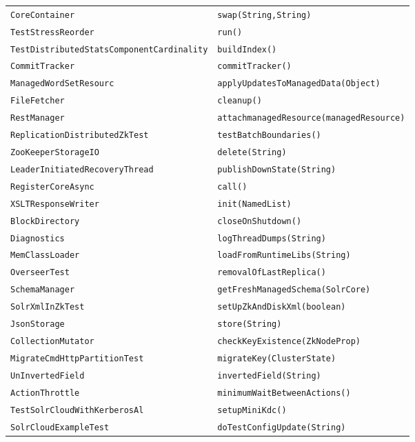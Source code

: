 \begin{center}
\begin{longtable}{ll}
\lstinline/CoreContainer/&{\lstinline/swap(String,String)/}\\
\lstinline/TestStressReorder/&{\lstinline/run()/}\\
\lstinline/TestDistributedStatsComponentCardinality/&{\lstinline/buildIndex()/}\\
\lstinline/CommitTracker/&{\lstinline/commitTracker()/}\\
\lstinline/ManagedWordSetResourc/&{\lstinline/applyUpdatesToManagedData(Object)/}\\
\lstinline/FileFetcher/&{\lstinline/cleanup()/}\\
\lstinline/RestManager/&{\lstinline/attachmanagedResource(managedResource)/}\\
\lstinline/ReplicationDistributedZkTest/&{\lstinline/testBatchBoundaries()/}\\
\lstinline/ZooKeeperStorageIO/&{\lstinline/delete(String)/}\\
\lstinline/LeaderInitiatedRecoveryThread/&{\lstinline/publishDownState(String)/}\\
\lstinline/RegisterCoreAsync/&{\lstinline/call()/}\\
\lstinline/XSLTResponseWriter/&{\lstinline/init(NamedList)/}\\
\lstinline/BlockDirectory/&{\lstinline/closeOnShutdown()/}\\
\lstinline/Diagnostics/&{\lstinline/logThreadDumps(String)/}\\
\lstinline/MemClassLoader/&{\lstinline/loadFromRuntimeLibs(String)/}\\
\lstinline/OverseerTest/&{\lstinline/removalOfLastReplica()/}\\
\lstinline/SchemaManager/&{\lstinline/getFreshManagedSchema(SolrCore)/}\\
\lstinline/SolrXmlInZkTest/&{\lstinline/setUpZkAndDiskXml(boolean)/}\\
\lstinline/JsonStorage/&{\lstinline/store(String)/}\\
\lstinline/CollectionMutator/&{\lstinline/checkKeyExistence(ZkNodeProp)/}\\
\lstinline/MigrateCmdHttpPartitionTest/&{\lstinline/migrateKey(ClusterState)/}\\
\lstinline/UnInvertedField/&{\lstinline/invertedField(String)/}\\
\lstinline/ActionThrottle/&{\lstinline/minimumWaitBetweenActions()/}\\
\lstinline/TestSolrCloudWithKerberosAl/&{\lstinline/setupMiniKdc()/}\\
\lstinline/SolrCloudExampleTest/&{\lstinline/doTestConfigUpdate(String)/}\\

\end{longtable}
\end{center}
